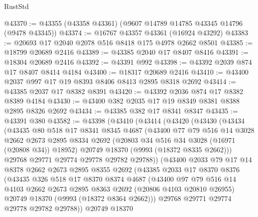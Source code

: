 \begin{lexlean}{RustStd}
\begin{coremodule}
@43370 := @43355 (@43358 @43361) (@9607 @14789 @14785 @43345 @14796 (@9478 @43345))
@43374 := @16767 @43357 @43361 (@16924 @43292)
@43383 := @20693 @17 @2040 @2078 @516 @8418 @175 @4978 @2662 @8501
@43385 := @18799 @20689 @2416
@43389 := @43385 @2040 @17 @8407 @8416
@43391 := @18304 @20689 @2416
@43392 := @43391 @992
@43398 := @43392 @2039 @874 @17 @8407 @8414 @4184
@43400 := @18317 @20689 @2416
@43410 := @43400 @2037 @997 @17 @19 @8393 @8406 @8413 @2895 @8318 @2692
@43414 := @43385 @2037 @17 @8382 @8391
@43420 := @43392 @2036 @874 @17 @8382 @8389 @4184
@43430 := @43400 @382 @2035 @17 @19 @8349 @8381 @8388 @2895 @8326 @2692
@43434 := @43385 @382 @17 @8341 @8347
@43435 := @43391 @380
@43582 := @43398
    (@43410
      (@43414
        (@43420
          (@43430
            (@43434
              (@43435
                @80
                @518
                @17
                @8341
                @8345
                @4687
                (@43400
                  @77
                  @79
                  @516
                  @14
                  @3028
                  @2662
                  @2673
                  @2895
                  @8334
                  @2692
                  (@20803 @34 @516 @34 @3028 (@16971 (@20808 @34)) @18952)
                  @20749
                  @18370
                  (@9993 (@18372 @8335 @2662)))
                @29768
                @29771
                @29774
                @29778
                @29782
                @29788))
            (@43400
              @2033
              @79
              @17
              @14
              @8378
              @2662
              @2673
              @2895
              @8355
              @2692
              (@43385
                @2033
                @17
                @8370
                @8376
                (@43435
                  @326
                  @518
                  @17
                  @8370
                  @8374
                  @4687
                  (@43400
                    @97
                    @79
                    @516
                    @14
                    @4103
                    @2662
                    @2673
                    @2895
                    @8363
                    @2692
                    (@20806 @4103 @20810 @26955)
                    @20749
                    @18370
                    (@9993 (@18372 @8364 @2662)))
                  @29768
                  @29771
                  @29774
                  @29778
                  @29782
                  @29788))
              @20749
              @18370

\end{coremodule}
\end{lexlean}
